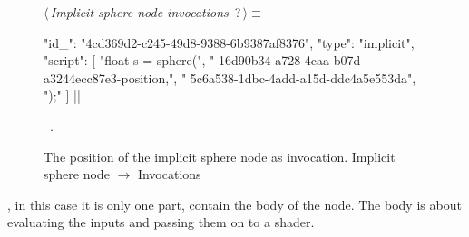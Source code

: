 \documentclass[%
    a4paper,    %
    justified,  %
    nobib,      %
    openany     %
]{tufte-book}
\begin{document}
\begin{figure}
\begin{flushleft} \small
\begin{minipage}{\linewidth}\label{scrap103}\raggedright\small
{} $\langle\,${\itshape Implicit sphere node invocations}\nobreak\ {\footnotesize {?}}$\,\rangle\equiv$
\vspace{-1ex}
\begin{pythoncode}
{
    "id_": "4cd369d2-c245-49d8-9388-6b9387af8376",
    "type": "implicit",
    "script": [
        "float s = sphere(",
        "    16d90b34-a728-4caa-b07d-a3244ecc87e3-position,",
        "    5c6a538-1dbc-4add-a15d-ddc4a5e553da",
        ");"
    ]
}|\NWsep|
\end{pythoncode}
\vspace{1.5ex}
\footnotesize
\begin{list}{}{\setlength{\itemsep}{-\parsep}\setlength{\itemindent}{-\leftmargin}}
\item \NWtxtMacroRefIn\ .

\item{}
\end{list}
\end{minipage}\vspace{4ex}
\end{flushleft}
\caption{The position of the implicit sphere node as invocation.
  \newline{}\newline{}Implicit sphere node $\rightarrow$ Invocations}
\label{editor:lst:nodes:sphere-node:invocations:position}
\end{figure}

, in this case it is only one part, contain
the body of the node. The body is about evaluating the inputs and passing them
on to a shader.

\end{document}
